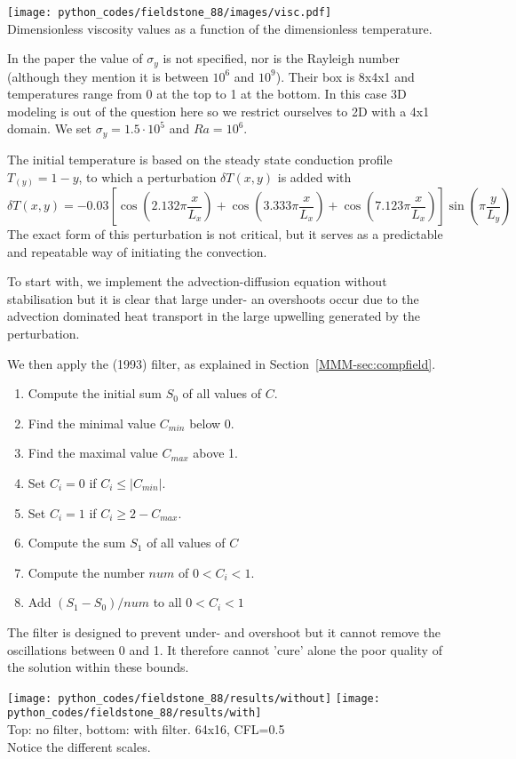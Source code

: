 \begin{center}
\texttt{[image: python\_codes/fieldstone\_88/images/visc.pdf]}\\
{\captionfont Dimensionless viscosity values as a function of the dimensionless temperature.}
\end{center}

In the paper the value of $\sigma_y$ is not specified, nor is the Rayleigh number (although 
they mention it is between $10^6$ and $10^9$).
Their box is 8x4x1 and temperatures range from 0 at the top to 1 at the bottom.
In this case 3D modeling is out of the question here so we restrict ourselves to 2D with a 4x1 domain. 
We set $\sigma_y=1.5\cdot 10^5$ and $Ra=10^6$.

The initial temperature is based on the steady state conduction profile $T_(y)=1-y$, to which a
perturbation $\delta T(x,y)$ is added with 
\[
\delta T(x,y) = -0.03 \left[ \cos\left(2.132\pi \frac{x}{L_x}\right)
+ \cos\left(3.333\pi  \frac{x}{L_x}\right)
+ \cos\left(7.123 \pi  \frac{x}{L_x} \right) \right] \sin \left(\pi  \frac{y}{L_y} \right)
\]
The exact form of this perturbation is not critical, but it serves as a predictable and repeatable way of 
initiating the convection.

To start with, we implement the advection-diffusion equation without stabilisation but it is clear that 
large under- an overshoots occur due to the advection dominated heat transport in the large upwelling 
generated by the perturbation.

We then apply the \textcite{leka93} (1993) filter, as explained 
in Section~\ref{MMM-sec:compfield}.
\begin{enumerate}
\item Compute the initial sum $S_0$ of all values of $C$.
\item Find the minimal value $C_{min}$ below 0.
\item Find the maximal value $C_{max}$ above 1.
\item Set $C_i=0$ if $C_i \leq |C_{min}|$.
\item Set $C_i=1$ if $C_i \geq 2-C_{max}$. 
\item Compute the sum $S_1$ of all values of $C$
\item Compute the number $num$ of $0 < C_i < 1$.
\item Add $(S_1-S_0)/num$ to all $0<C_i<1$
\end{enumerate}

The filter is designed to prevent under- and overshoot but it cannot remove the oscillations between 0 and 1.
It therefore cannot 'cure' alone the poor quality of the solution within these bounds.
\begin{center}
\texttt{[image: python\_codes/fieldstone\_88/results/without]}
\texttt{[image: python\_codes/fieldstone\_88/results/with]}\\
{\captionfont Top: no filter, bottom: with filter. 64x16, CFL=0.5\\ Notice the different scales.}
\end{center}

